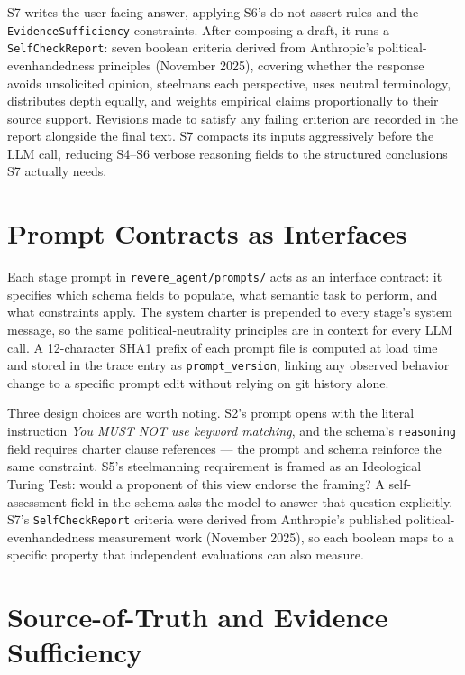 \documentclass[11pt,letterpaper]{article}
\newcommand{\code}[1]{\texttt{\small #1}}
\newcommand{\file}[1]{\texttt{\small #1}}
\begin{document}
S7 writes the user-facing answer, applying S6's do-not-assert rules and the
\code{EvidenceSufficiency} constraints. After composing a draft, it runs a
\code{SelfCheckReport}: seven boolean criteria derived from Anthropic's
political-evenhandedness principles (November 2025), covering whether the
response avoids unsolicited opinion, steelmans each perspective, uses neutral
terminology, distributes depth equally, and weights empirical claims
proportionally to their source support. Revisions made to satisfy any failing
criterion are recorded in the report alongside the final text. S7 compacts its
inputs aggressively before the LLM call, reducing S4--S6 verbose reasoning
fields to the structured conclusions S7 actually needs.


\section{Prompt Contracts as Interfaces}
\label{sec:prompts}

Each stage prompt in \file{revere\_agent/prompts/} acts as an interface
contract: it specifies which schema fields to populate, what semantic task to
perform, and what constraints apply. The system charter is prepended to every
stage's system message, so the same political-neutrality principles are in
context for every LLM call. A 12-character SHA1 prefix of each prompt file is
computed at load time and stored in the trace entry as \code{prompt\_version},
linking any observed behavior change to a specific prompt edit without relying
on git history alone.

Three design choices are worth noting. S2's prompt opens with the literal
instruction \textit{You MUST NOT use keyword matching}, and the schema's
\code{reasoning} field requires charter clause references --- the prompt and
schema reinforce the same constraint. S5's steelmanning requirement is framed
as an Ideological Turing Test: would a proponent of this view endorse the
framing? A self-assessment field in the schema asks the model to answer that
question explicitly. S7's \code{SelfCheckReport} criteria were derived from
Anthropic's published political-evenhandedness measurement work (November
2025), so each boolean maps to a specific property that independent evaluations
can also measure.


\section{Source-of-Truth and Evidence Sufficiency}
\label{sec:sourceoftruth}
\end{document}
